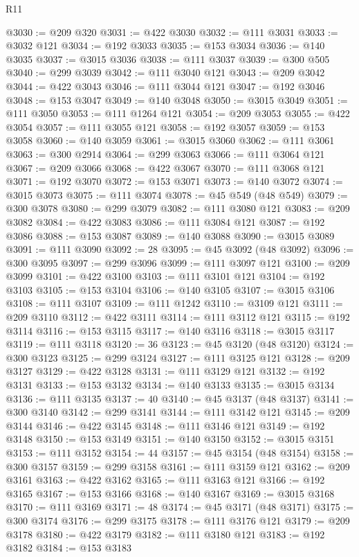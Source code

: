 \begin{lexlean}{R11}
\begin{coremodule}
{{{{{{{{{{{{{{{{{{{{{{{{{{{{{{{{{{{{{{{{{{{{{{{{{{{{{{{{{{{{{{{{{{{{{{{{{{{{{{{{{{@3030 := @209 @320
@3031 := @422 @3030
@3032 := @111 @3031
@3033 := @3032 @121
@3034 := @192 @3033
@3035 := @153 @3034
@3036 := @140 @3035
@3037 := @3015 @3036
@3038 := @111 @3037
@3039 := @300 @505
@3040 := @299 @3039
@3042 := @111 @3040 @121
@3043 := @209 @3042
@3044 := @422 @3043
@3046 := @111 @3044 @121
@3047 := @192 @3046
@3048 := @153 @3047
@3049 := @140 @3048
@3050 := @3015 @3049
@3051 := @111 @3050
@3053 := @111 @1264 @121
@3054 := @209 @3053
@3055 := @422 @3054
@3057 := @111 @3055 @121
@3058 := @192 @3057
@3059 := @153 @3058
@3060 := @140 @3059
@3061 := @3015 @3060
@3062 := @111 @3061
@3063 := @300 @2914
@3064 := @299 @3063
@3066 := @111 @3064 @121
@3067 := @209 @3066
@3068 := @422 @3067
@3070 := @111 @3068 @121
@3071 := @192 @3070
@3072 := @153 @3071
@3073 := @140 @3072
@3074 := @3015 @3073
@3075 := @111 @3074
@3078 := @45 @549 (@48 @549)
@3079 := @300 @3078
@3080 := @299 @3079
@3082 := @111 @3080 @121
@3083 := @209 @3082
@3084 := @422 @3083
@3086 := @111 @3084 @121
@3087 := @192 @3086
@3088 := @153 @3087
@3089 := @140 @3088
@3090 := @3015 @3089
@3091 := @111 @3090
@3092 := 28
@3095 := @45 @3092 (@48 @3092)
@3096 := @300 @3095
@3097 := @299 @3096
@3099 := @111 @3097 @121
@3100 := @209 @3099
@3101 := @422 @3100
@3103 := @111 @3101 @121
@3104 := @192 @3103
@3105 := @153 @3104
@3106 := @140 @3105
@3107 := @3015 @3106
@3108 := @111 @3107
@3109 := @111 @1242
@3110 := @3109 @121
@3111 := @209 @3110
@3112 := @422 @3111
@3114 := @111 @3112 @121
@3115 := @192 @3114
@3116 := @153 @3115
@3117 := @140 @3116
@3118 := @3015 @3117
@3119 := @111 @3118
@3120 := 36
@3123 := @45 @3120 (@48 @3120)
@3124 := @300 @3123
@3125 := @299 @3124
@3127 := @111 @3125 @121
@3128 := @209 @3127
@3129 := @422 @3128
@3131 := @111 @3129 @121
@3132 := @192 @3131
@3133 := @153 @3132
@3134 := @140 @3133
@3135 := @3015 @3134
@3136 := @111 @3135
@3137 := 40
@3140 := @45 @3137 (@48 @3137)
@3141 := @300 @3140
@3142 := @299 @3141
@3144 := @111 @3142 @121
@3145 := @209 @3144
@3146 := @422 @3145
@3148 := @111 @3146 @121
@3149 := @192 @3148
@3150 := @153 @3149
@3151 := @140 @3150
@3152 := @3015 @3151
@3153 := @111 @3152
@3154 := 44
@3157 := @45 @3154 (@48 @3154)
@3158 := @300 @3157
@3159 := @299 @3158
@3161 := @111 @3159 @121
@3162 := @209 @3161
@3163 := @422 @3162
@3165 := @111 @3163 @121
@3166 := @192 @3165
@3167 := @153 @3166
@3168 := @140 @3167
@3169 := @3015 @3168
@3170 := @111 @3169
@3171 := 48
@3174 := @45 @3171 (@48 @3171)
@3175 := @300 @3174
@3176 := @299 @3175
@3178 := @111 @3176 @121
@3179 := @209 @3178
@3180 := @422 @3179
@3182 := @111 @3180 @121
@3183 := @192 @3182
@3184 := @153 @3183
}}}}}}}}}}}}}}}}}}}}}}}}}}}}}}}}}}}}}}}}}}}}}}}}}}}}}}}}}}}}}}}}}}}}}}}}}}}}}}}}}}
\end{coremodule}
\end{lexlean}
